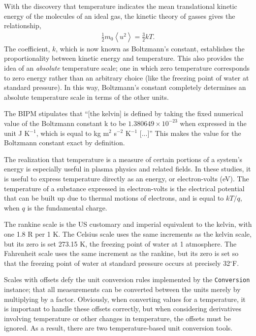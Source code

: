 With the discovery that temperature indicates the mean translational kinetic energy of the molecules of an ideal gas, the kinetic theory of gasses gives the relationship,
\begin{align}
\frac{1}{2} m_0 \left< u^2 \right> = \frac{3}{2} k T.
\end{align}
The coefficient, $k$, which is now known as Boltzmann's constant, establishes the proportionality between kinetic energy and temperature.  This also provides the idea of an \emph{absolute} temperature scale; one in which zero temperature corresponds to zero energy rather than an arbitrary choice (like the freezing point of water at standard pressure).  In this way, Boltzmann's constant completely determines an absolute temperature scale in terms of the other units.

The BIPM stipulates that ``[the kelvin] is defined by taking the fixed numerical value of the Boltzmann constant k to be $1.380 649 \times 10^{-23}$ when expressed in the unit J K$^{-1}$, which is equal to kg m$^2$ s$^{-2}$ K$^{-1}$ [...]''\cite[p.133]{si:2019}  This makes the value for the Boltzmann constant exact by definition.

The realization that temperature is a measure of certain portions of a system's energy is especially useful in plasma physics and related fields.  In these studies, it is useful to express temperature directly as an energy, or electron-volts (eV).  The temperature of a substance expressed in electron-volts is the electrical potential that can be built up due to thermal motions of electrons, and is equal to $kT / q$, when $q$ is the fundamental charge.

The rankine scale is the US customary and imperial equivalent to the kelvin, with one 1.8 R per 1 K.  The Celsius scale uses the same increments as the kelvin scale, but its zero is set 273.15 K, the freezing point of water at 1 atmosphere.  The Fahrenheit scale uses the same increment as the rankine, but its zero is set so that the freezing point of water at standard pressure occurs at precisely 32$^\circ$F.

Scales with offsets defy the unit conversion rules implemented by the \verb|Conversion| instance; that all measurements can be converted between the units merely by multiplying by a factor.  Obviously, when converting values for a temperature, it is important to handle these offsets correctly, but when considering derivatives involving temperature or other changes in temperature, the offsets must be ignored.  As a result, there are two temperature-based unit conversion tools.

